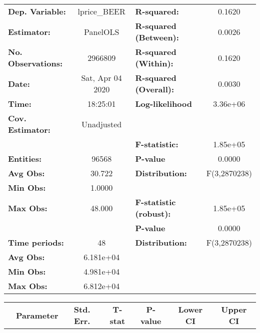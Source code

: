 \documentclass{report}
\begin{document}
\begin{center}
\begin{tabular}{lclc}
\toprule
\textbf{Dep. Variable:}    &    lprice\_BEER    & \textbf{  R-squared:         }   &      0.1620      \\
\textbf{Estimator:}        &      PanelOLS      & \textbf{  R-squared (Between):}  &      0.0026      \\
\textbf{No. Observations:} &      2966809       & \textbf{  R-squared (Within):}   &      0.1620      \\
\textbf{Date:}             &  Sat, Apr 04 2020  & \textbf{  R-squared (Overall):}  &      0.0030      \\
\textbf{Time:}             &      18:25:01      & \textbf{  Log-likelihood     }   &     3.36e+06     \\
\textbf{Cov. Estimator:}   &     Unadjusted     & \textbf{                     }   &                  \\
\textbf{}                  &                    & \textbf{  F-statistic:       }   &     1.85e+05     \\
\textbf{Entities:}         &       96568        & \textbf{  P-value            }   &      0.0000      \\
\textbf{Avg Obs:}          &       30.722       & \textbf{  Distribution:      }   &   F(3,2870238)   \\
\textbf{Min Obs:}          &       1.0000       & \textbf{                     }   &                  \\
\textbf{Max Obs:}          &       48.000       & \textbf{  F-statistic (robust):} &     1.85e+05     \\
\textbf{}                  &                    & \textbf{  P-value            }   &      0.0000      \\
\textbf{Time periods:}     &         48         & \textbf{  Distribution:      }   &   F(3,2870238)   \\
\textbf{Avg Obs:}          &     6.181e+04      & \textbf{                     }   &                  \\
\textbf{Min Obs:}          &     4.981e+04      & \textbf{                     }   &                  \\
\textbf{Max Obs:}          &     6.812e+04      & \textbf{                     }   &                  \\
\bottomrule
\end{tabular}
\begin{tabular}{lcccccc}
                           & \textbf{Parameter} & \textbf{Std. Err.} & \textbf{T-stat} & \textbf{P-value} & \textbf{Lower CI} & \textbf{Upper CI}  \\

\end{tabular}
\end{center}
\end{document}
